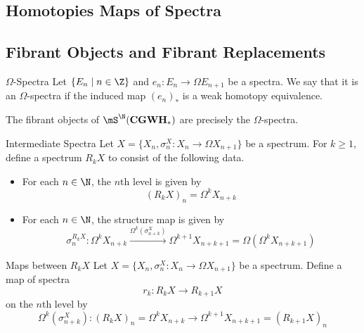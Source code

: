 \documentclass[a4paper]{article}
\begin{document}
\subsection{Homotopies Maps of Spectra}

\subsection{Fibrant Objects and Fibrant Replacements}
\begin{defn}{$\Omega$-Spectra}{} Let $\{E_n\;|\;n\in\Z\}$ and $e_n:E_n\to\Omega E_{n+1}$ be a spectra. We say that it is an $\Omega$-spectra if the induced map $(e_n)_\ast$ is a weak homotopy equivalence. 
\end{defn}

\begin{prp}{}{} The fibrant objects of $\mS^\N(\bold{CGWH}_\ast)$ are precisely the $\Omega$-spectra. 
\end{prp}

\begin{defn}{Intermediate Spectra}{} Let $X=\{X_n,\sigma_n^X:X_n\to\Omega X_{n+1}\}$ be a spectrum. For $k\geq 1$, define a spectrum $R_kX$ to consist of the following data. 
\begin{itemize}
\item For each $n\in\N$, the $n$th level is given by $$(R_kX)_n=\Omega^k X_{n+k}$$
\item For each $n\in\N$, the structure map is given by $$\sigma_n^{R_kX}:\Omega^kX_{n+k}\overset{\Omega^k(\sigma_{n+k}^X)}{\longrightarrow}\Omega^{k+1}X_{n+k+1}=\Omega(\Omega^kX_{n+k+1})$$
\end{itemize}
\end{defn}

\begin{defn}{Maps between $R_kX$}{} Let $X=\{X_n,\sigma_n^X:X_n\to\Omega X_{n+1}\}$ be a spectrum. Define a map of spectra $$r_k:R_kX\to R_{k+1}X$$ on the $n$th level by $$\Omega^k(\sigma_{n+k}^X):(R_kX)_n=\Omega^kX_{n+k}\to\Omega^{k+1}X_{n+k+1}=(R_{k+1}X)_n$$
\end{defn}
\end{document}
